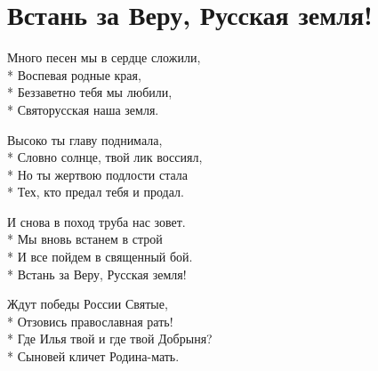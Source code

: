 \vspace{\fill}\newpage

\section{Встань за Веру, Русская земля!}
\label{song:Встань_за_Веру,_Русская_земля!}

\medskip

\begin{minipage}{\linewidth}
Много песен мы в сердце сложили,\\*
Воспевая родные края,\\*
Беззаветно тебя мы любили,\\*
Святорусская наша земля.\\
\end{minipage}\par\medskip\nobreak

\medskip

\begin{minipage}{\linewidth}
Высоко ты главу поднимала,\\*
Словно солнце, твой лик воссиял,\\*
Но ты жертвою подлости стала\\*
Тех, кто предал тебя и продал.\\
\end{minipage}\par\medskip\nobreak

\medskip

\begin{minipage}{\linewidth}
\hspace*{1.5em}И снова в поход труба нас зовет.\\*
\hspace*{1.5em}Мы вновь встанем в строй\\*
\hspace*{1.5em}И все пойдем в священный бой.\\*
\hspace*{1.5em}Встань за Веру, Русская земля!\\
\end{minipage}\par\medskip\nobreak

\medskip

\begin{minipage}{\linewidth}
Ждут победы России Святые,\\*
Отзовись православная рать!\\*
Где Илья твой и где твой Добрыня?\\*
Сыновей кличет Родина-мать.\\
\end{minipage}\par\medskip\nobreak

